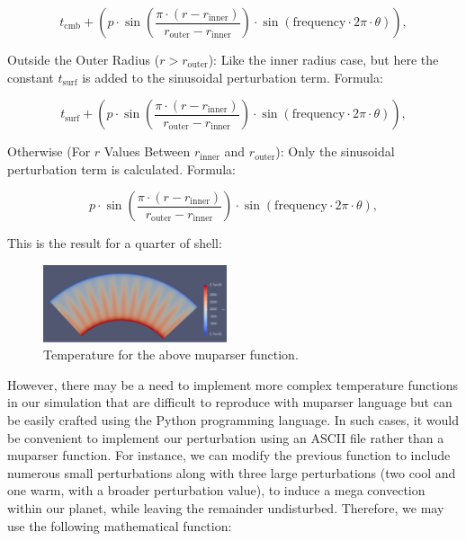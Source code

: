 \documentclass{article}
\begin{document}
\begin{equation}
t_\text{cmb} + \left( p \cdot \sin \left( \frac{\pi \cdot (r - r_\text{inner})}{r_\text{outer} - r_\text{inner}} \right) \cdot \sin \left( \text{frequency} \cdot 2\pi \cdot \theta \right) \right) ,
\end{equation}

Outside the Outer Radius (\(r > r_{\text{outer}}\)): Like the inner radius case, but here the constant \(t_{\text{surf}}\) is added to the sinusoidal perturbation term.
Formula:

\begin{equation}
t_\text{surf} + \left( p \cdot \sin \left( \frac{\pi \cdot (r - r_\text{inner})}{r_\text{outer} - r_\text{inner}} \right) \cdot \sin \left( \text{frequency} \cdot 2\pi \cdot \theta \right) \right) ,
\end{equation}

Otherwise (For \(r\) Values Between \(r_{\text{inner}}\) and \(r_{\text{outer}}\)): Only the sinusoidal perturbation term is calculated.
Formula:

\begin{equation}
p \cdot \sin \left( \frac{\pi \cdot (r - r_\text{inner})}{r_\text{outer} - r_\text{inner}} \right) \cdot \sin \left( \text{frequency} \cdot 2\pi \cdot \theta \right) ,
\end{equation}

This is the result for a quarter of shell:

\begin{figure}[h!]
\centering
\includegraphics[width=0.48\textwidth]{temperature.png}
\caption{Temperature for the above muparser function.}
\label{fig:temperature}
\end{figure}

However, there may be a need to implement more complex temperature functions in our simulation that are difficult to reproduce with muparser language but can be easily crafted using the Python programming language. In such cases, it would be convenient to implement our perturbation using an ASCII file rather than a muparser function.
For instance, we can modify the previous function to include numerous small perturbations along with three large perturbations (two cool and one warm, with a broader perturbation value), to induce a mega convection within our planet, while leaving the remainder undisturbed.
Therefore, we may use the following mathematical function:
\end{document}
